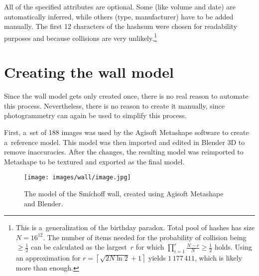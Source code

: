 All of the specified attributes are optional.
Some (like volume and date) are automatically inferred, while others (type, manufacturer) have to be added manually.
The first 12 characters of the hashsum were chosen for readability purposes and because collisions are very unlikely.\footnote{This is a~generalization of the birthday paradox. Total pool of hashes has size $N = 16^{12}$. The number of items needed for the probability of collision being $\ge \frac{1}{2}$ can be calculated as the largest~$r$ for which $\prod_{i = 1}^{r} \frac{N - r}{N} \ge \frac{1}{2}$ holds. Using an approximation for $r = \left\lceil \sqrt{2N \ln 2} + 1 \right\rceil$ \cite{brink2012probably} yields $1\,177\,411$, which is likely more than enough.}

\section{Creating the wall model}
Since the wall model gets only created once, there is no real reason to automate this process.
Nevertheless, there is no reason to create it manually, since photogrammetry can again be used to simplify this process.

First, a~set of 188 images was used by the Agisoft Metashape software to create a~reference model.
This model was then imported and edited in Blender 3D to remove inaccuracies.
After the changes, the resulting model was reimported to Metashape to be textured and exported as the final model.

\begin{figure}[h]
	\centering
	\texttt{[image: images/wall/image.jpg]}
	\caption{The model of the Smíchoff wall, created using Agisoft Metashape and Blender.}
	\label{fig:model}
\end{figure}
